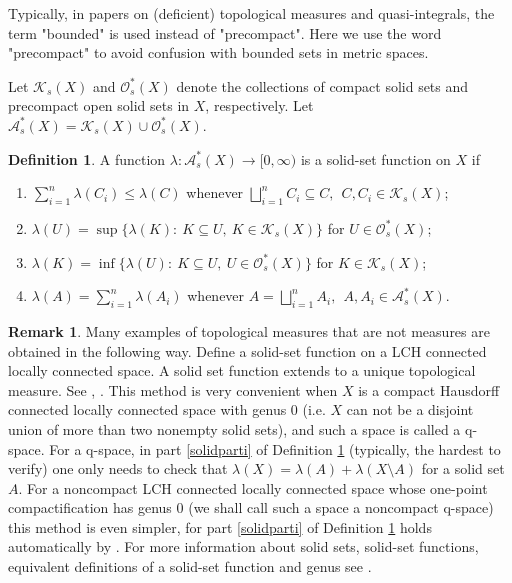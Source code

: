 \documentclass[sn-mathphys-num]{sn-jnl}%
\theoremstyle{thmstyleone}%
\theoremstyle{definition}
\newtheorem{definition}[theorem]{Definition}
\newtheorem{remark}[theorem]{Remark}
\begin{document}
Typically, in papers on (deficient) topological measures and quasi-integrals, the term "bounded" is used instead of "precompact".
Here we use the word "precompact" to avoid confusion with bounded sets in metric spaces.

Let  $\mathscr{K}_{s}(X)$ and $\mathscr{O}_s^*(X)$ denote the collections of compact solid sets and precompact open solid sets in $X$, respectively.  
Let  $ \mathscr{A}_{s}^{*}(X) = \mathscr{K}_{s}(X) \cup \mathscr{O}_s^*(X)$.
 
\begin{definition} \label{DeSSFLC}
A function $ \lambda: \mathscr{A}_{s}^{*}(X) \rightarrow [0, \infty) $ is a solid-set function on $X$ if
\begin{enumerate}[label=(s\arabic*),ref=(s\arabic*)]
\item \label{superadd}
$ \sum_{i=1}^n \lambda(C_i) \le \lambda(C)$ whenever $\bigsqcup_{i=1}^n C_i \subseteq C,  \ \  C, C_i \in \mathscr{K}_{s}(X)$; 
\item \label{regul}
$ \lambda(U) = \sup \{ \lambda(K): \ K \subseteq U , \ K \in \mathscr{K}_{s}(X) \}$ for $U \in \mathscr{O}_{s}^{*}(X)$; 
\item \label{regulo}
$ \lambda(K) = \inf \{ \lambda(U) : \  K \subseteq U, \ U \in \mathscr{O}_{s}^{*}(X) \}$ for $ K  \in \mathscr{K}_{s}(X)$; 
\item  \label{solidparti}
$ \lambda(A) = \sum_{i=1}^n \lambda (A_i)$ whenever $A = \bigsqcup_{i=1}^n A_i, \ \ A , A_i  \in \mathscr{A}_{s}^{*}(X)$.
\end{enumerate}
\end{definition}

\begin{remark}
Many examples of topological measures that are not measures are obtained in the following way. Define a solid-set function on 
a LCH connected locally connected space. A solid set function extends to a unique topological measure. 
See \cite[Def. 2.3, Th. 5.1]{Aarnes:ConstructionPaper}, \cite[Def. 6.1, Th. 10.7]{Butler:TMLCconstr}.
This method is very convenient when $X$ is a compact Hausdorff connected locally connected space with genus 0 
(i.e. $X$ can not be a disjoint union of more than two nonempty solid sets), and such a space is called a q-space.
For a q-space, in part \ref{solidparti} of Definition \ref{DeSSFLC}  (typically, the hardest to verify) one only needs to check that
$\lambda(X) = \lambda(A) + \lambda(X \setminus A)$ for a solid set $A$. 
For a noncompact LCH connected locally connected space whose one-point compactification has genus 0 
(we shall call such a space a noncompact q-space)
this method is even simpler, for  part \ref{solidparti} of Definition \ref{DeSSFLC} holds automatically by \cite[L. 15.2]{Butler:TMLCconstr}.
For more information about solid sets, solid-set functions, equivalent definitions of a solid-set function and genus
see \cite[Rem. 6.3, Sect. 11, Sect. 12, L. 15.2]{Butler:TMLCconstr}.
\end{remark}
\end{document}
